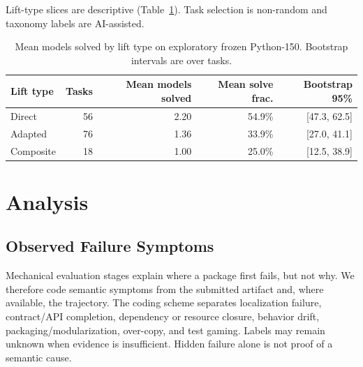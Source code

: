\documentclass[acmsmall,anonymous,review,screen]{acmart}
\begin{document}
Lift-type slices are descriptive (Table~\ref{tab:python150-lift}). Task
selection is non-random and taxonomy labels are AI-assisted.

\begin{table}[t]
  \caption{Mean models solved by lift type on exploratory frozen Python-150.
  Bootstrap intervals are over tasks.}
  \label{tab:python150-lift}
  \centering
  \begin{tabular}{lrrrr}
  \toprule
  \textbf{Lift type} & \textbf{Tasks} & \textbf{Mean models solved} & \textbf{Mean solve frac.} & \textbf{Bootstrap 95\%} \\
  \midrule
  Direct & 56 & 2.20 & 54.9\% & [47.3, 62.5] \\
  Adapted & 76 & 1.36 & 33.9\% & [27.0, 41.1] \\
  Composite & 18 & 1.00 & 25.0\% & [12.5, 38.9] \\
  \bottomrule
  \end{tabular}
\end{table}

\section{Analysis}
\label{sec:analysis}

\subsection{Observed Failure Symptoms}

Mechanical evaluation stages explain where a package first fails, but not why.
We therefore code semantic symptoms from the submitted artifact and, where
available, the trajectory. The coding scheme separates localization failure,
contract/API completion, dependency or resource closure, behavior drift,
packaging/modularization, over-copy, and test gaming. Labels may remain
unknown when evidence is insufficient. Hidden failure alone is not proof of a
semantic cause.
\end{document}

